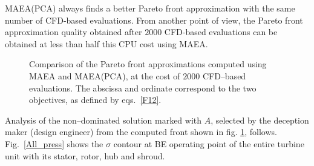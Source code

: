 MAEA(PCA) always finds a better Pareto front approximation with the same number of CFD-based evaluations. From another point of view, the Pareto front approximation quality obtained after $2000$ CFD-based evaluations can be  obtained at less than half this CPU cost using MAEA. 

\begin{figure}[h!]
\begin{minipage}[b]{1\linewidth}
 \centering
\end{minipage}
\caption{Comparison of the Pareto front approximations computed using MAEA and MAEA(PCA), at the cost of $2000$ CFD--based evaluations.  The abscissa and ordinate correspond to the two objectives, as defined by eqs.~\ref{F12}.}
\label{pareto_matrix}
\end{figure}
 
 
Analysis of the non--dominated solution marked with $A$, selected by the deception maker (design engineer) from the computed front shown in fig. \ref{pareto_matrix}, follows. Fig.~\ref{All_press} shows the $\sigma$ contour at BE operating point of the entire turbine unit with its stator, rotor, hub and shroud. 

